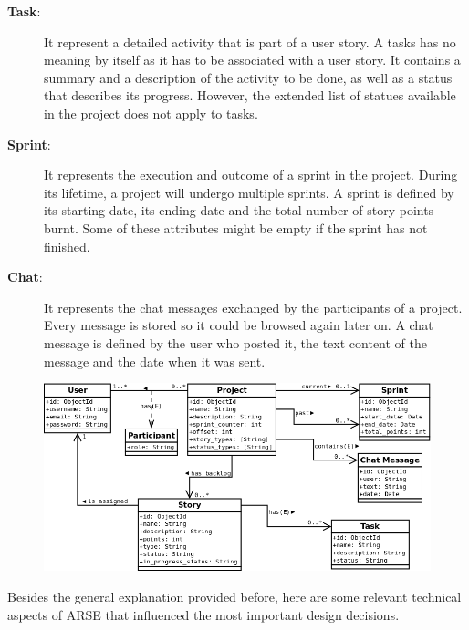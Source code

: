 \documentclass[
	accentcolor=tud1a %
]{tudreport}
\begin{document}
\begin{description}
\item[\textbf{Task}:] It represent a detailed activity that is part of a user story. A tasks has no meaning by itself as it has to be associated with a user story. It contains a summary and a description of the activity to be done, as well as a status that describes its progress. However, the extended list of statues available in the project does not apply to tasks.

\item[\textbf{Sprint}:] It represents the execution and outcome of a sprint in the project. During its lifetime, a project will undergo multiple sprints. A sprint is defined by its starting date, its ending date and the total number of story points burnt. Some of these attributes might be empty if the sprint has not finished.

\item[\textbf{Chat}:] It represents the chat messages exchanged by the participants of a project. Every message is stored so it could be browsed again later on. A chat message is defined by the user who posted it, the text content of the message and the date when it was sent.

\end{description}

\begin{figure}[ht]
  \centering
    \includegraphics[height=20EM]{img/class-diagram}
    \label{fig:class-diagram}
\end{figure}

Besides the general explanation provided before, here are some relevant technical aspects of ARSE that influenced the most important design decisions.
\end{document}
